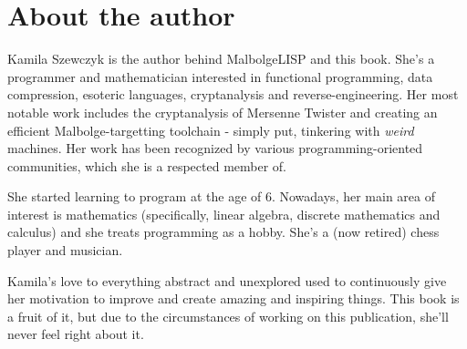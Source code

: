 
\chapter*{About the author}
\par Kamila Szewczyk is the author behind MalbolgeLISP and this book. She's a programmer and mathematician interested in functional programming, data compression, esoteric languages, cryptanalysis and reverse-engineering. Her most notable work includes the cryptanalysis of Mersenne Twister and creating an efficient Malbolge-targetting toolchain - simply put, tinkering with \textit{weird} machines. Her work has been recognized by various programming-oriented communities, which she is a respected member of.

\par She started learning to program at the age of 6. Nowadays, her main area of interest is mathematics (specifically, linear algebra, discrete mathematics and calculus) and she treats programming as a hobby. She's a (now retired) chess player and musician.

\par Kamila's love to everything abstract and unexplored used to continuously give her motivation to improve and create amazing and inspiring things. This book is a fruit of it, but due to the circumstances of working on this publication, she'll never feel right about it.
